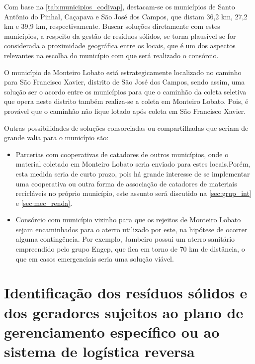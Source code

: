 
\FloatBarrier

Com base na \autoref{tab:municipios_codivap}, destacam-se os municípios de Santo Antônio do Pinhal, Caçapava e São José dos Campos, que distam 36,2 km, 27,2 km e 39,9 km, respectivamente. Buscar soluções diretamente com estes municípios, a respeito da gestão de resíduos sólidos, se torna plausível se for considerada a proximidade geográfica entre os locais, que é um dos aspectos relevantes na escolha do município com que será realizado o consórcio.

O município de Monteiro Lobato está estrategicamente localizado no caminho para São Francisco Xavier, distrito de São José dos Campos, sendo assim, uma solução ser o acordo entre os municípios para que o caminhão da coleta seletiva que opera neste distrito também realiza-se a coleta em Monteiro Lobato. Pois, é provável que o caminhão não fique lotado após coleta em São Francisco Xavier.

Outras possibilidades de soluções consorciadas ou compartilhadas que seriam de grande valia para o município são: 
\begin{itemize}
	\item Parcerias com cooperativas de catadores de outros municípios, onde o material coletado em Monteiro Lobato seria enviado para estes locais.Porém, esta medida seria de curto prazo, pois há grande interesse de se implementar uma cooperativa ou outra forma de associação de catadores de materiais recicláveis no próprio município, este assunto será discutido na \autoref{sec:grup_int} e \autoref{sec:mec_renda}.
	
	\item Consórcio com município vizinho para que os rejeitos de Monteiro Lobato sejam encaminhados para o aterro utilizado por este, na hipótese de ocorrer alguma contingência. Por exemplo, Jambeiro possui um aterro sanitário empreendido pelo grupo Engep, que fica em torno de 70 km de distância, o que em casos emergenciais seria uma solução viável.
	
\end{itemize}


\newpage
\FloatBarrier
\section{Identificação dos resíduos sólidos e dos geradores sujeitos ao plano de gerenciamento específico ou ao sistema de logística reversa}
\label{sec:rs_geradores_lr}

